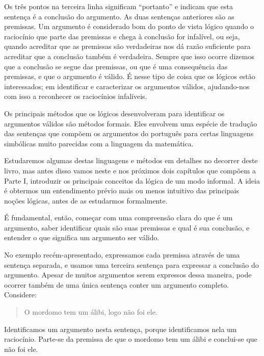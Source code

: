 
\noindent Os três pontos na terceira linha significam ``portanto'' e indicam que esta sentença é a conclusão do argumento. As duas sentenças anteriores são as premissas.
Um argumento é considerado bom do ponto de vista lógico quando o raciocínio que parte das premissas e chega à conclusão for infalível, ou seja, quando acreditar que as premissas são verdadeiras nos dá razão suficiente para acreditar que a conclusão também é verdadeira. Sempre que isso ocorre dizemos que a conclusão se segue das premissas, ou que é uma consequência das premissas, e que o argumento é válido.
É nesse tipo de coisa que os lógicos estão interessados; em identificar e caracterizar os argumentos válidos, ajudando-nos com isso a reconhecer os raciocínios infalíveis.  

Os principais métodos que os lógicos desenvolveram para identificar os argumentos válidos são métodos formais.
Eles envolvem uma espécie de tradução das sentenças que compõem os argumentos do português para certas linguagens simbólicas muito parecidas com a linguagem da matemática.

Estudaremos algumas destas linguagens e métodos em detalhes no decorrer deste livro, mas antes disso vamos neste e nos próximos dois capítulos que compõem a Parte I, introduzir os principais conceitos da lógica de um modo informal.
A ideia é obtermos um entendimento prévio mais ou menos intuitivo das principais noções lógicas, antes de as estudarmos formalmente.

É fundamental, então, começar com uma compreensão clara do que é um argumento, saber identificar quais são suas premissas e qual é sua conclusão, e entender o que  significa um argumento ser válido.



No exemplo recém-apresentado, expressamos cada premissa através de uma sentença separada, e usamos uma terceira sentença para  expressar a conclusão do argumento.
Apesar de muitos argumentos serem expressos dessa maneira, pode ocorrer também de uma única sentença conter um argumento completo. 
Considere:
	\begin{quote}
		O mordomo tem um álibi, logo não foi ele.
	\end{quote}
Identificamos um argumento nesta sentença, porque identificamos nela um raciocínio. Parte-se da premissa de que o mordomo tem um álibi e conclui-se que não foi ele.

